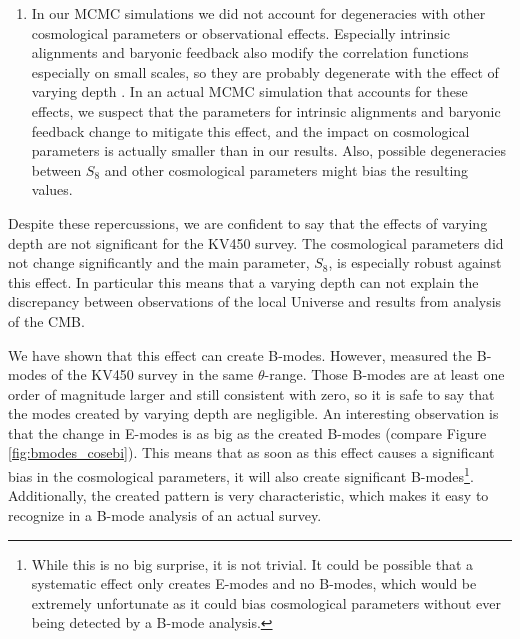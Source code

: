 \documentclass[referee]{aa} %
\renewcommand{\[}{\begin{equation}}
\renewcommand{\]}{\end{equation}}
\renewcommand{\rm}{\mathrm}
\begin{document}
\begin{enumerate}
\item In our MCMC simulations we did not account for degeneracies with other cosmological parameters
 or observational effects. Especially intrinsic alignments and baryonic feedback also modify the correlation functions especially on small scales, so they are probably degenerate with the effect of varying depth \citep{Troxel:2015}. In an actual MCMC simulation that accounts for these effects, we suspect that the parameters for intrinsic alignments and baryonic feedback change to mitigate this effect, and the impact on cosmological parameters is actually smaller than in our results. Also, possible degeneracies between $S_8$ and other cosmological parameters might bias the resulting values. %
\end{enumerate}

Despite these repercussions, we are confident to say that the effects of varying depth are not significant for the KV450 survey. The cosmological parameters did not change significantly and the main parameter, $S_8$, is especially robust against this effect. In particular this means that a varying depth can not explain the discrepancy between observations of the local Universe and results from analysis of the CMB.

We have shown that this effect can create B-modes. However, \citet{2018arXiv181002353A} measured the B-modes of the KV450 survey in the same $\theta$-range. Those B-modes are at least one order of magnitude larger and still consistent with zero, so it is safe to say that the modes created by varying depth are negligible. An interesting observation is that the change in E-modes is as big as the created B-modes (compare Figure \ref{fig:bmodes_cosebi}). This means that as soon as this effect causes a significant bias in the cosmological parameters, it will also create significant B-modes\footnote{While this is no big surprise, it is not trivial. It could be possible that a systematic effect only creates E-modes and no B-modes, which would be extremely unfortunate as it could bias cosmological parameters without ever being detected by a B-mode analysis.}. Additionally, the created pattern is very characteristic, which makes it easy to recognize in a B-mode analysis of an actual survey.
\end{document}

